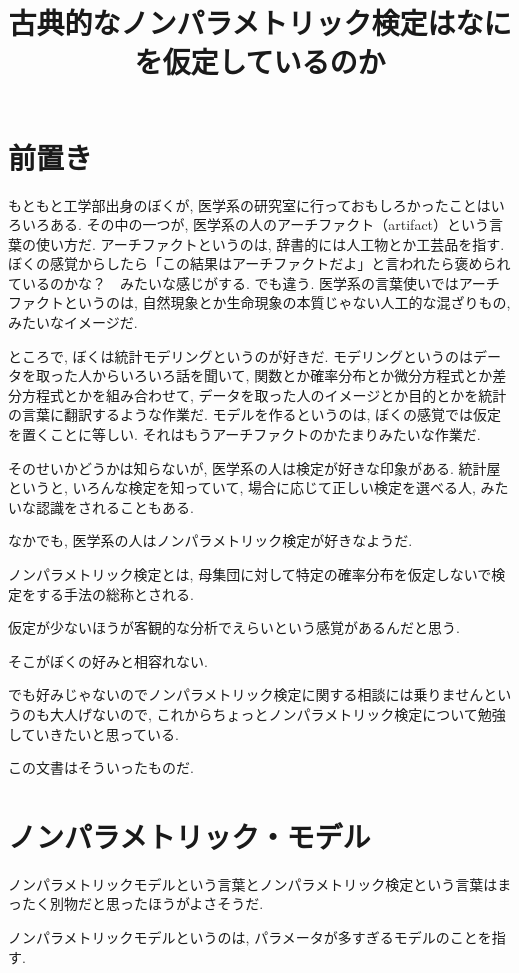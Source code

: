 \documentclass[11pt]{amsart}
\title{古典的なノンパラメトリック検定はなにを仮定しているのか}
\author{}
\begin{document}
\maketitle
\section{前置き}
もともと工学部出身のぼくが, 医学系の研究室に行っておもしろかったことはいろいろある. 
その中の一つが, 医学系の人のアーチファクト（artifact）という言葉の使い方だ. 
アーチファクトというのは, 辞書的には人工物とか工芸品を指す.
ぼくの感覚からしたら「この結果はアーチファクトだよ」と言われたら褒められているのかな？　みたいな感じがする.
でも違う. 医学系の言葉使いではアーチファクトというのは, 自然現象とか生命現象の本質じゃない人工的な混ざりもの, みたいなイメージだ.

ところで, ぼくは統計モデリングというのが好きだ. モデリングというのはデータを取った人からいろいろ話を聞いて, 関数とか確率分布とか微分方程式とか差分方程式とかを組み合わせて, データを取った人のイメージとか目的とかを統計の言葉に翻訳するような作業だ. モデルを作るというのは, ぼくの感覚では仮定を置くことに等しい. 
それはもうアーチファクトのかたまりみたいな作業だ.

そのせいかどうかは知らないが, 医学系の人は検定が好きな印象がある. 統計屋というと, いろんな検定を知っていて, 場合に応じて正しい検定を選べる人, みたいな認識をされることもある.

なかでも, 医学系の人はノンパラメトリック検定が好きなようだ. 

ノンパラメトリック検定とは, 母集団に対して特定の確率分布を仮定しないで検定をする手法の総称とされる. 

仮定が少ないほうが客観的な分析でえらいという感覚があるんだと思う.

そこがぼくの好みと相容れない. 

でも好みじゃないのでノンパラメトリック検定に関する相談には乗りませんというのも大人げないので, これからちょっとノンパラメトリック検定について勉強していきたいと思っている.

この文書はそういったものだ.

\section{ノンパラメトリック・モデル}

ノンパラメトリックモデルという言葉とノンパラメトリック検定という言葉はまったく別物だと思ったほうがよさそうだ.

ノンパラメトリックモデルというのは, パラメータが多すぎるモデルのことを指す.
\end{document}
